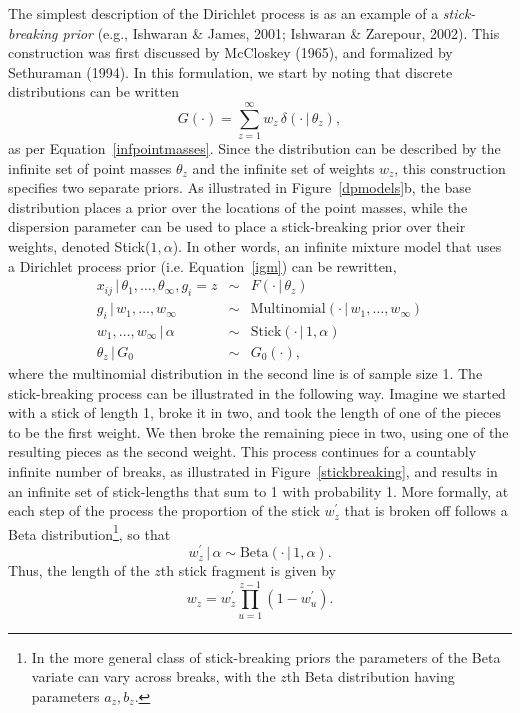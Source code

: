 \documentclass[authoryear]{elsarticle}
\newcommand{\condon}{\,|\,}
\newcommand{\panel}[1]{#1}
\newcommand{\stick}{w}
\begin{document}
The simplest description of the Dirichlet process is as an
example of a {\it stick-breaking prior} (e.g., Ishwaran \& James, 2001; Ishwaran
\& Zarepour, 2002). This construction was first discussed by McCloskey (1965),
and formalized by Sethuraman (1994). In this formulation,  we start by noting
that discrete distributions can be written
\[
        G(\cdot)=\sum_{z=1}^{\infty} w_z \, \delta(\cdot \condon \theta_z),
\]
as per Equation~\ref{infpointmasses}. Since the distribution can be described by
 the infinite set of point masses $\theta_z$ and the infinite set of weights $\stick_z$,
this construction specifies two separate priors. As illustrated in
Figure~\ref{dpmodels}\panel{b}, the base distribution places a prior over the
locations of the point masses, while the dispersion parameter can be used to place
 a stick-breaking prior over their weights, denoted Stick($1,\alpha$).
In other words, an infinite mixture model that uses a Dirichlet process prior
(i.e. Equation~\ref{igm}) can be rewritten,
\begin{equation}
        \begin{array}{rcl}
        x_{ij} \condon \theta_1, \ldots, \theta_\infty, g_i=z
        & \sim & F(\cdot \condon \theta_z) \\
        g_i \condon w_1, \ldots, w_\infty & \sim &
        \mbox{Multinomial}(\cdot \condon w_1, \ldots, w_\infty) \\
        w_1, \ldots, w_\infty \condon \alpha & \sim &
        \mbox{Stick}(\cdot \condon 1,\alpha) \\
        \theta_z \condon G_0 & \sim & G_0(\cdot),
        \end{array}
        \label{infiniteprior}
\end{equation}
where the multinomial distribution in the second line is of sample size 1.
The stick-breaking process can be illustrated in the following way. Imagine we
started with a stick of length 1, broke it in two, and took the length of one of
the pieces to be the first weight. We then broke the remaining  piece in two,
using one of the resulting pieces as the second weight.
This process continues for a countably infinite number of breaks, as
illustrated in Figure~\ref{stickbreaking}, and results in an infinite set of
stick-lengths that sum to 1 with probability 1. More formally, at each step of the
process the proportion of the stick $w_z^{\prime}$ that is broken off follows a Beta
distribution\footnote{In the more general class of stick-breaking priors the
parameters of the Beta variate can vary across breaks, with the $z$th Beta
distribution having parameters $a_z,b_z$.}, so that
\[
        w_z^{\prime} \condon \alpha \sim \mbox{Beta}(\cdot \condon 1,\alpha).
\]
Thus, the length of the $z$th stick fragment is given by
\[
        w_z = w_z^\prime \prod_{u=1}^{z-1} (1-w_u^\prime).
\]
\end{document}
